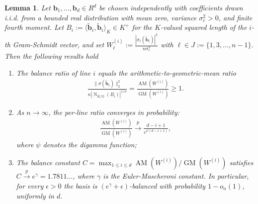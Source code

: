 \documentclass[11pt,a4paper]{article}
\theoremstyle{plain}
\newtheorem{lemma}[theorem]{Lemma}
\theoremstyle{definition}
\theoremstyle{remark}
\DeclareMathOperator{\Nm}{N}
\newcommand{\Q}{\mathbb{Q}}
\begin{document}
\begin{lemma}\label{lem:mlwebal}
Let $\mathbf{b}_1, \dots, \mathbf{b}_d\in R^d$ be chosen independently with coefficients drawn i.i.d. from a bounded real distribution with mean zero, variance $\sigma_c^2>0$, and finite fourth moment. Let   $B_i:=\langle\tilde{\mathbf{b}}_i, \tilde{\mathbf{b}}_i\rangle_K\in K^+$ for the $K$-valued squared length of the $i$-th Gram-Schmidt vector, and set $W^{(i)}_\ell:=\tfrac{|\sigma_\ell(\tilde{\mathbf{b}}_i)|^2}{n\sigma_c^2}$ with $\ell\in J:=\{1, 3, \dots, n-1\}$. Then the following results hold
  \begin{enumerate}[label=(\roman*),nosep]
    \item The balance ratio of line $i$ equals the
          arithmetic-to-geometric-mean ratio
    \begin{align}
      \frac{\|\sigma(\tilde{\mathbf{b}}_i)\|_2^2}{n|\Nm_{K/\Q}(B_i)|^{1/n}}=\frac{\operatorname{AM}(W^{(i)})}{\operatorname{GM}(W^{(i)})} \ge 1.
      \label{E:amgclt}
    \end{align}
    
    \item As $n\to\infty$, the per-line ratio converges in probability:
    \begin{align}
      \frac{\operatorname{AM}(W^{(i)})}{\operatorname{GM}(W^{(i)})}
      \xrightarrow{p}\frac{d-i+1}{e^{\psi(d-i+1)}},
      \label{E:perlinlim}
    \end{align}
    where $\psi$ denotes the digamma function;
    
    \item The balance constant $C=\max_{1\le i\le d}\operatorname{AM}(W^{(i)})/\operatorname{GM}(W^{(i)})$ satisfies $C\xrightarrow{p}e^{\gamma}=1.7811\ldots$, where $\gamma$ is     the Euler-Mascheroni constant. In particular, for every $\epsilon>0$ the basis is $(e^{\gamma}+\epsilon)$-balanced with probability $1-o_n(1)$, uniformly in $d$.
  \end{enumerate}
  
\end{lemma}
\end{document}
